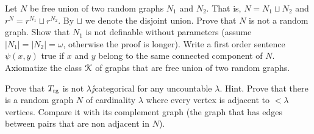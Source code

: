 \documentclass[creche.tex]{subfiles}
\begin{document}
\begin{exercise}\label{unionedisgiunta}
Let $N$ be free union of two random graphs $N_1$ and $N_2$. That is, $N=N_1\sqcup N_2$ and $r^N= r^{N_1}\sqcup r^{N_2}$. By $\sqcup$ we denote the disjoint union. Prove that $N$ is not a random graph. Show that $N_1$ is not definable without parameters (assume $|N_1|=|N_2|=\omega$, otherwise the proof is longer). Write a first order sentence $\psi(x,y)$ true if $x$ and $y$ belong to the same connected component of $N$. Axiomatize the class $\EuScript K$ of graphs that are free union of two random graphs.\QED
\end{exercise}

%
%

%

\begin{exercise}
Prove that $T_{\rm rg}$ is not $\lambda\jj$categorical for any uncountable $\lambda$. Hint. Prove that there is a random graph $N$ of cardinality $\lambda$ where every vertex is adjacent to $<\lambda$ vertices. Compare it with its complement graph (the graph that has edges between pairs that are non adjacent in $N$).\QED
\end{exercise}
\end{document}
